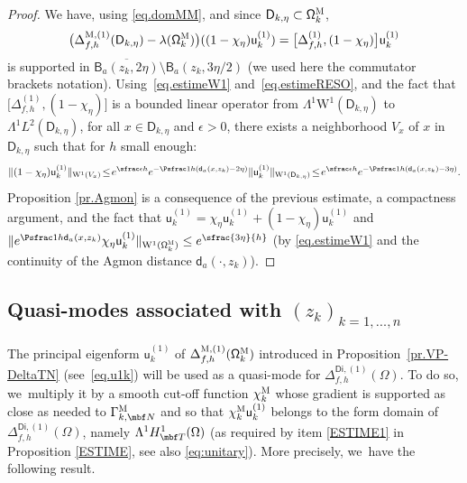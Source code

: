 \begin{proof}
We have, using \eqref{eq.domMM}, and since $\mathsf D_{k,\eta}\subset \mathsf \Omega_k^{\textsc{M}}$,
\[
\bigl(\Delta_{f,h}^{\text{M}, (1)} (\mathsf D_{k,\eta}) - \lambda(\mathsf \Omega_k^{\textsc{M}}) \bigr) ((1-\chi_\eta)\mathsf u^{(1)}_k)= \big [ \Delta_{f,h}^{ (1)},(1-\chi_\eta)\big] \mathsf u^{(1)}_k
\]
is supported in $\overline{\mathsf B_{a}(z_k,2\eta)}\setminus \mathsf
B_{a}(z_k,3\eta/2)$ (we used here the commutator brackets notation).
Using~\eqref{eq.estimeW1} and~\eqref{eq.estimeRESO}, and the fact
that $\big [ \Delta_{f,h}^{ (1)},(1-\chi_\eta)\big] $ is a
bounded linear operator from $\Lambda^1\mathrm{W}^1(\mathsf
D_{k,\eta})$ to $\Lambda^1L^2(\mathsf D_{k,\eta})$, for all $x\in
\mathsf D_{k,\eta}$ and $\epsilon>0$, there exists a
neighborhood $V_x$ of $x$ in $\mathsf D_{k,\eta}$ such that for
$h$ small enough:
\[
\Vert (1-\chi_\eta)\mathsf u^{(1)}_k \Vert_{\mathrm W^1(V_x)} \!\le\! e^{\sfrac \epsilon h} e^{-\Psfrac 1h(\mathsf d_a(x,z_k)-2\eta)} \Vert \mathsf u^{(1)}_k \Vert _{\mathrm W^1(\mathsf D_{k,\eta})}\!\le\! e^{\sfrac \epsilon h} e^{-\Psfrac 1h(\mathsf d_a(x,z_k)-3\eta)}.
\]
Proposition \ref{pr.Agmon} is a consequence of the previous estimate,
a compactness argument, and the fact that $ \mathsf
u^{(1)}_k=\chi_\eta\mathsf u^{(1)}_k+(1-\chi_\eta)\mathsf u^{(1)}_k$
and $\Vert e^{\Psfrac 1h \mathsf d_a(x,z_k) } \chi_\eta \mathsf u^{(1)}_k \Vert _{\mathrm W^1(\mathsf \Omega_k^{\textsc{M}})}\le e^{\sfrac {3\eta}{h}}$ (by \eqref{eq.estimeW1} and the continuity of the Agmon distance $\mathsf d_a(\cdot,z_k)$).
\end{proof}

\subsection{Quasi-modes associated with $(z_k)_{k=1,\ldots,n}$}\label{sec:vk1}
The principal eigenform $\mathsf u^{(1)}_k$ of
$\Delta_{f,h}^{\textsc{M},(1)} (\mathsf \Omega_k^{\textsc{M}})$
introduced in Proposition~\ref{pr.VP-DeltaTN} (see~\eqref{eq.u1k}) will be used as a quasi-mode for $\Delta_{f,h}^{\mathsf{Di},(1)} (\Omega) $. To do so, we~multiply it by a smooth cut-off function $\chi_k^{\textsc{M}} $ whose gradient is supported as close as needed to $\Gamma_{k,\mbf N}^{\textsc{M}}$ and so that $\chi_k^{\textsc{M}} \mathsf u^{(1)}_k$ belongs to the form domain of $\Delta_{f,h}^{\mathsf{Di},(1)} (\Omega) $, namely $\Lambda^1H^1_{\mbf T}(\Omega) $ (as required by item \eqref{ESTIME1} in Proposition \ref{ESTIME}, see also \eqref{eq:unitary}). More precisely, we~have the following result.

